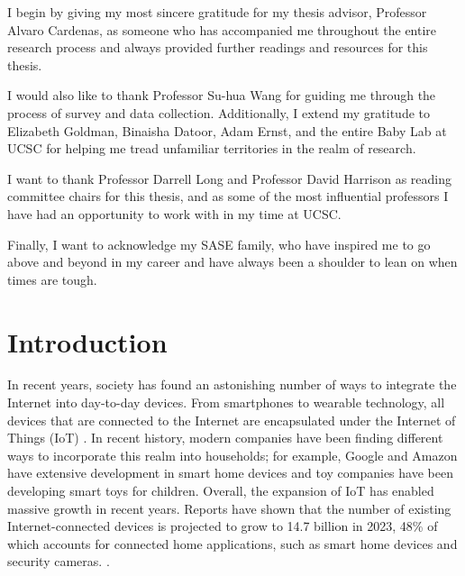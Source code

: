\documentclass[12pt]{ucthesis}
\begin{document}
\begin{frontmatter}
\begin{acknowledgements}
I begin by giving my most sincere gratitude for my thesis advisor, Professor Alvaro Cardenas, as someone who has accompanied me throughout the entire research process and always provided further readings and resources for this thesis.

I would also like to thank Professor Su-hua Wang for guiding me through the process of survey and data collection. Additionally, I extend my gratitude to Elizabeth Goldman, Binaisha Datoor, Adam Ernst, and the entire Baby Lab at UCSC for helping me tread unfamiliar territories in the realm of research.

I want to thank Professor Darrell Long and Professor David Harrison as reading committee chairs for this thesis, and as some of the most influential professors I have had an opportunity to work with in my time at UCSC.

Finally, I want to acknowledge my SASE family, who have inspired me to go above and beyond in my career and have always been a shoulder to lean on when times are tough.

\end{acknowledgements}

\end{frontmatter}

\chapter{Introduction}
In recent years, society has found an astonishing number of ways to integrate the Internet into day-to-day devices. From smartphones to wearable technology, all devices that are connected to the Internet are encapsulated under the Internet of Things (IoT) \cite{gubbi:iot}. In recent history, modern companies have been finding different ways to incorporate this realm into households; for example, Google and Amazon have extensive development in smart home devices and toy companies have been developing smart toys for children. Overall, the expansion of IoT has enabled massive growth in recent years. Reports have shown that the number of existing Internet-connected devices is projected to grow to 14.7 billion in 2023, 48\% of which accounts for connected home applications, such as smart home devices and security cameras. \cite{cisco}.
\end{document}
